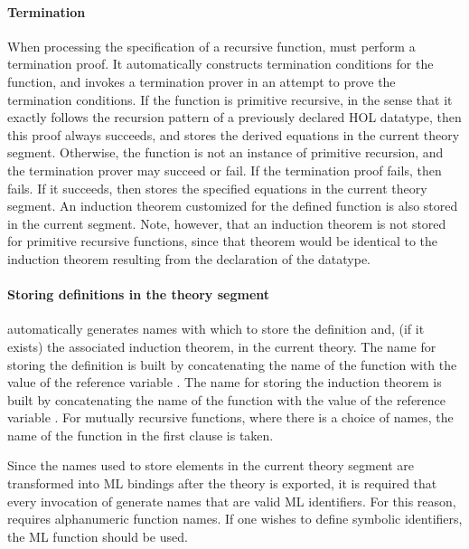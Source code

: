 \paragraph{Termination} 

When processing the specification of a recursive function, 
must perform a termination proof. It automatically constructs
termination conditions for the function, and invokes a termination
prover in an attempt to prove the termination conditions.  If the
function is primitive recursive, in the sense that it exactly follows
the recursion pattern of a previously declared HOL datatype, then this
proof always succeeds, and  stores the derived equations in
the current theory segment.  
Otherwise, the function is not an
instance of primitive recursion, and the termination prover may
succeed or fail. If the termination proof fails, then  fails.
If it succeeds, then  stores the specified equations in the
current theory segment. An induction theorem customized for the defined
function is also stored in the current segment. Note, however, that an
induction theorem is not stored for primitive recursive functions, since
that theorem would be identical to the induction theorem resulting from
the declaration of the datatype.
 
 
\paragraph{Storing definitions in the theory segment}

  automatically generates names with which to store the
definition and, (if it exists) the associated induction theorem, in
the current theory. The name for storing the definition is built by
concatenating the name of the function with the value of the reference
variable . The name for storing the induction theorem
is built by concatenating the name of the function with the value of
the reference variable . For mutually recursive
functions, where there is a choice of names, the name of the function
in the first clause is taken.
 
 Since the names used to store elements in the current theory segment
are transformed into ML bindings after the theory is exported, it is
required that every invocation of  generate names that are
valid ML identifiers. For this reason,  requires
alphanumeric function names. If one wishes to define symbolic
identifiers, the ML function  should be used.

